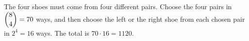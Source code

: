 The four shoes must come from four different pairs. Choose the four pairs in $\dbinom84=70$ ways, and then choose the left or the right shoe from each chosen pair in $2^4=16$ ways. The total is $70\cdot16=\boxed{1120}$.
